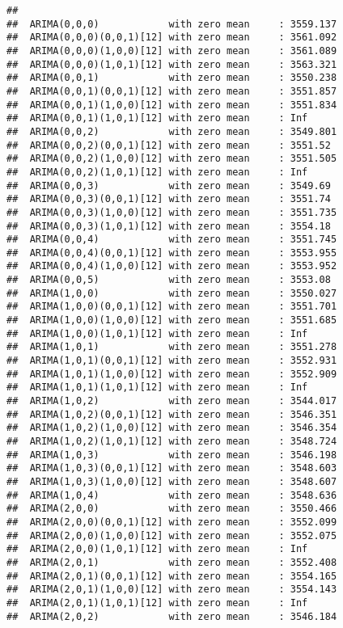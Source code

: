 \documentclass[
]{book}
\begin{document}
\begin{verbatim}
## 
##  ARIMA(0,0,0)            with zero mean     : 3559.137
##  ARIMA(0,0,0)(0,0,1)[12] with zero mean     : 3561.092
##  ARIMA(0,0,0)(1,0,0)[12] with zero mean     : 3561.089
##  ARIMA(0,0,0)(1,0,1)[12] with zero mean     : 3563.321
##  ARIMA(0,0,1)            with zero mean     : 3550.238
##  ARIMA(0,0,1)(0,0,1)[12] with zero mean     : 3551.857
##  ARIMA(0,0,1)(1,0,0)[12] with zero mean     : 3551.834
##  ARIMA(0,0,1)(1,0,1)[12] with zero mean     : Inf
##  ARIMA(0,0,2)            with zero mean     : 3549.801
##  ARIMA(0,0,2)(0,0,1)[12] with zero mean     : 3551.52
##  ARIMA(0,0,2)(1,0,0)[12] with zero mean     : 3551.505
##  ARIMA(0,0,2)(1,0,1)[12] with zero mean     : Inf
##  ARIMA(0,0,3)            with zero mean     : 3549.69
##  ARIMA(0,0,3)(0,0,1)[12] with zero mean     : 3551.74
##  ARIMA(0,0,3)(1,0,0)[12] with zero mean     : 3551.735
##  ARIMA(0,0,3)(1,0,1)[12] with zero mean     : 3554.18
##  ARIMA(0,0,4)            with zero mean     : 3551.745
##  ARIMA(0,0,4)(0,0,1)[12] with zero mean     : 3553.955
##  ARIMA(0,0,4)(1,0,0)[12] with zero mean     : 3553.952
##  ARIMA(0,0,5)            with zero mean     : 3553.08
##  ARIMA(1,0,0)            with zero mean     : 3550.027
##  ARIMA(1,0,0)(0,0,1)[12] with zero mean     : 3551.701
##  ARIMA(1,0,0)(1,0,0)[12] with zero mean     : 3551.685
##  ARIMA(1,0,0)(1,0,1)[12] with zero mean     : Inf
##  ARIMA(1,0,1)            with zero mean     : 3551.278
##  ARIMA(1,0,1)(0,0,1)[12] with zero mean     : 3552.931
##  ARIMA(1,0,1)(1,0,0)[12] with zero mean     : 3552.909
##  ARIMA(1,0,1)(1,0,1)[12] with zero mean     : Inf
##  ARIMA(1,0,2)            with zero mean     : 3544.017
##  ARIMA(1,0,2)(0,0,1)[12] with zero mean     : 3546.351
##  ARIMA(1,0,2)(1,0,0)[12] with zero mean     : 3546.354
##  ARIMA(1,0,2)(1,0,1)[12] with zero mean     : 3548.724
##  ARIMA(1,0,3)            with zero mean     : 3546.198
##  ARIMA(1,0,3)(0,0,1)[12] with zero mean     : 3548.603
##  ARIMA(1,0,3)(1,0,0)[12] with zero mean     : 3548.607
##  ARIMA(1,0,4)            with zero mean     : 3548.636
##  ARIMA(2,0,0)            with zero mean     : 3550.466
##  ARIMA(2,0,0)(0,0,1)[12] with zero mean     : 3552.099
##  ARIMA(2,0,0)(1,0,0)[12] with zero mean     : 3552.075
##  ARIMA(2,0,0)(1,0,1)[12] with zero mean     : Inf
##  ARIMA(2,0,1)            with zero mean     : 3552.408
##  ARIMA(2,0,1)(0,0,1)[12] with zero mean     : 3554.165
##  ARIMA(2,0,1)(1,0,0)[12] with zero mean     : 3554.143
##  ARIMA(2,0,1)(1,0,1)[12] with zero mean     : Inf
##  ARIMA(2,0,2)            with zero mean     : 3546.184

\end{verbatim}
\end{document}
